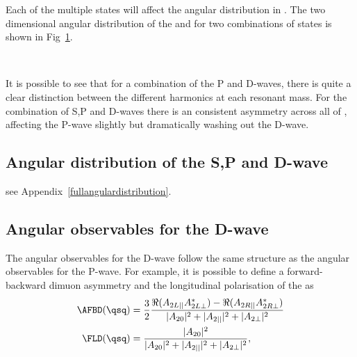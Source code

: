 Each of the multiple \Kstarz states will affect the angular distribution in \ctk.
The two dimensional angular distribution of the \psq and \ctk for two combinations of \Kstarz states is shown in Fig~\ref{fig:ctk:spdwave}.
\begin{figure}[tbp]
\centering
{}
\caption{ ~\label{fig:ctk:spdwave} }
\end{figure}
It is possible to see that for a combination of the P and D-waves, there is quite a clear distinction between
the different harmonics at each resonant mass.
For the combination of S,P and D-waves there is an consistent asymmetry across all of \psq, affecting the 
P-wave slightly but dramatically washing out the D-wave.

\subsection{Angular distribution of the S,P and D-wave}


see Appendix~\ref{fullangulardistribution}.



\subsection{Angular observables for the D-wave }

The angular observables for the \kpi D-wave follow the same structure 
as the angular observables for the P-wave. 
For example, it is possible to define a forward-backward dimuon asymmetry 
and the longitudinal polarisation of the \Kstarz as
\begin{equation}
\begin{split}
\label{eq:theodobs}
\AFBD(\qsq) &= \frac{3}{2} \frac{  \Re(A_{2L||}A_{2L\bot}^{*}) - 
\Re(A_{2R||}A_{2R\bot}^{*})}{|A_{20}|^2 + |A_{2||}|^2 + |A_{2\bot}|^2 } \\
\FLD(\qsq) &= \frac{  |A_{20}|^2 } {|A_{20}|^2 + |A_{2||}|^2 + |A_{2\bot}|^2} ,
\end{split}
\end{equation}

